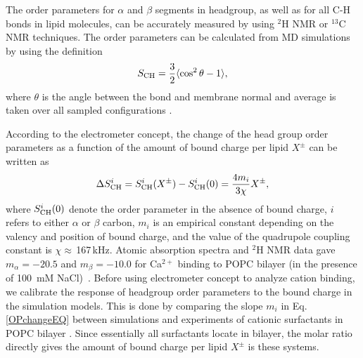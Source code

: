 \documentclass[aip,jcp,twocolumn]{revtex4}
\begin{document}
The order parameters for $\alpha$ and $\beta$ segments in headgroup, as well as for
all C-H bonds in lipid molecules,
can be accurately measured by using $^2$H NMR or $^{13}$C NMR techniques.
The order parameters can be calculated from MD simulations 
by using the definition
\begin{equation}\label{OP}
S_{\rm CH}=\frac{3}{2}\langle \cos^2\theta -1 \rangle,
\end{equation}
where $\theta$ is the angle between the bond and membrane
normal and average is taken over all sampled configurations \cite{ollila16}.

According to the electrometer concept,
the change of the head group order parameters as a function of
the amount of bound charge per lipid $X^\pm$ 
can be written as~\cite{ferreira16}
\begin{equation}\label{OPchangeEQ}
\Delta S_{\rm{CH}}^{i}= S_{\rm{CH}}^{i}(X^\pm)-S_{\rm{CH}}^{i}(0) =\frac{4m_i }{3\chi}X^\pm,
\end{equation}
where $S_{\rm{CH}}^{i}(0)$ denote the order parameter in the absence of bound charge,
$i$ refers to either $\alpha$ or $\beta$ carbon,
$m_i$ is an empirical constant depending on the valency and position of bound charge,
and the value of the quadrupole coupling constant is $\chi \approx$\,167\,kHz.
Atomic absorption spectra and $^2$H NMR data gave
$m_\alpha=-20.5$  and $m_\beta=-10.0$ for Ca$^{2+}$ binding to POPC
bilayer (in the presence of 100~mM NaCl)~\cite{altenbach84,ollila16,catte16}.
Before using electrometer concept to analyze cation binding, 
we calibrate the response of headgroup order parameters to the bound
charge in the simulation models. This is done by comparing 
the slope $m_i$ in Eq. \ref{OPchangeEQ} between simulations and
experiments of cationic surfactants in POPC bilayer \cite{scherer89}. 
Since essentially all surfactants locate in bilayer, the 
molar ratio directly gives the amount of bound charge per 
lipid $X^\pm$ is these systems.
\end{document}

